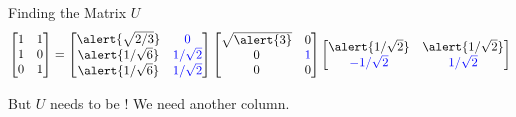 \documentclass[xcolor=dvipsnames,aspectratio=169,t]{beamer}
\begin{document}
\begin{frame}{Finding the Matrix $U$}
  \[  \begin{bmatrix} 1 & 1 \\ 1 & 0 \\ 0 & 1 \end{bmatrix} = 
  \begin{bmatrix} \alert{\sqrt{2/3}}  &  \colorb{0} \\ \alert{1/\sqrt{6}} & \colorb{1/\sqrt{2}} \\  \alert{1/\sqrt{6}} & \colorb{1/\sqrt{2}}\end{bmatrix}
  \begin{bmatrix} \sqrt{\alert{3}} & 0 \\ 0 & \colorb{1} \\ 0 & 0 \end{bmatrix}
  \begin{bmatrix} \alert{1/\sqrt{2}} & \alert{1/\sqrt{2}} \\  \colorb{-1/\sqrt{2}} & \colorb{1/\sqrt{2}} \end{bmatrix}\]
  
  \pause
  \hfill But $U$ needs to be !  We need another column.
\end{frame}
\end{document}

